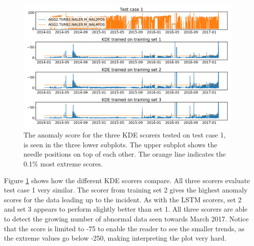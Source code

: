         \begin{figure}[h!]
            \centering
            \includegraphics[width=\textwidth]{report/figures/analysis/training_cases/kde_training_cases.png}
            \caption{The anomaly score for the three KDE scorers tested on test case 1, is seen in the three lower subplots. The upper subplot shows the needle positions on top of each other. The orange line indicates the 0.1\% most extreme scores.}
            \label{fig:kde_training_cases}
        \end{figure}
        Figure \ref{fig:kde_training_cases} shows how the different KDE scorers compare. All three scorers evaluate test case 1 very similar. The scorer from training set 2 gives the highest anomaly scores for the data leading up to the incident. As with the LSTM scorers, set 2 and set 3 appears to perform slightly better than set 1. All three scorers are able to detect the growing number of abnormal data seen towards March 2017. Notice that the score is limited to -75 to enable the reader to see the smaller trends, as the extreme values go below -250, making interpreting the plot very hard.
        
